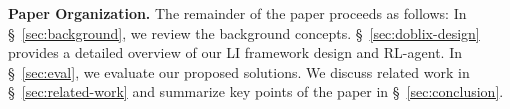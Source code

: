 \noindent\textbf{Paper Organization.} The remainder of the paper proceeds as follows: In \S~\ref{sec:background}, we review the background concepts. \S~\ref{sec:doblix-design} provides a detailed overview of our LI framework design and RL-agent. In \S~\ref{sec:eval}, we evaluate our proposed solutions. We discuss related work in \S~\ref{sec:related-work} and summarize key points of the paper in \S~\ref{sec:conclusion}. 